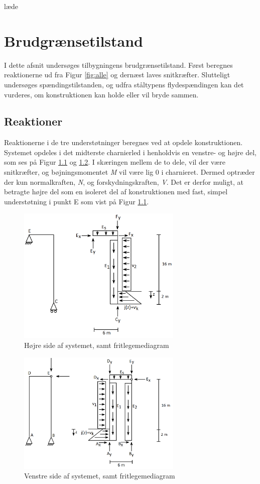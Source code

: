 læde\chapter{Brudgrænsetilstand}
I dette afsnit undersøges tilbygningens brudgrænsetilstand. Først beregnes reaktionerne ud fra Figur \ref{fig:alle} og dernæst laves snitkræfter. Slutteligt undersøges spændingstilstanden, og udfra ståltypens flydespændingen kan det vurderes, om konstruktionen kan holde eller vil bryde sammen.   

\section{Reaktioner}
Reaktionerne i de tre understøtninger beregnes ved at opdele konstruktionen. Systemet opdeles i det midterste charnierled i henholdvis en venstre- og højre del, som ses på Figur \ref{fig:opdelingh} og \ref{fig:opdelingv}. I skæringen mellem de to dele, vil der være snitkræfter, og bøjningsmomentet \textit{M} vil være lig 0 i charnieret. Dermed optræder der kun normalkraften, \textit{N}, og forskydningskraften, \textit{V}. Det er derfor muligt, at betragte højre del som en isoleret del af konstruktionen med fast, simpel understøtning i punkt E som vist på Figur \ref{fig:opdelingh}.

\begin{figure}[H]
	\centering
	\includegraphics[width=0.7\textwidth]{billeder/hojre.png}
	\caption{Højre side af systemet, samt fritlegemediagram}
	\label{fig:opdelingh}
\end{figure}

\begin{figure}[H]
	\centering
	\includegraphics[width=0.7\textwidth]{billeder/venstre.png}
	\caption{Venstre side af systemet, samt fritlegemediagram}
	\label{fig:opdelingv}
\end{figure}

